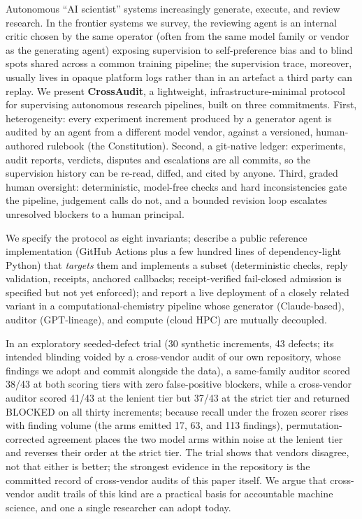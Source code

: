 \noindent Autonomous ``AI scientist'' systems increasingly generate, execute, and review research. In the frontier systems we survey, the reviewing agent is an internal critic chosen by the same operator (often from the same model family or vendor as the generating agent) exposing supervision to self-preference bias and to blind spots shared across a common training pipeline; the supervision trace, moreover, usually lives in opaque platform logs rather than in an artefact a third party can replay. We present \textbf{CrossAudit}, a lightweight, infrastructure-minimal protocol for supervising autonomous research pipelines, built on three commitments. First, heterogeneity: every experiment increment produced by a generator agent is audited by an agent from a different model vendor, against a versioned, human-authored rulebook (the Constitution). Second, a git-native ledger: experiments, audit reports, verdicts, disputes and escalations are all commits, so the supervision history can be re-read, diffed, and cited by anyone. Third, graded human oversight: deterministic, model-free checks and hard inconsistencies gate the pipeline, judgement calls do not, and a bounded revision loop escalates unresolved blockers to a human principal. \par
We specify the protocol as eight invariants; describe a public reference implementation (GitHub Actions plus a few hundred lines of dependency-light Python) that \emph{targets} them and implements a subset (deterministic checks, reply validation, receipts, anchored callbacks; receipt-verified fail-closed admission is specified but not yet enforced); and report a live deployment of a closely related variant in a computational-chemistry pipeline whose generator (Claude-based), auditor (GPT-lineage), and compute (cloud HPC) are mutually decoupled. \par
In an exploratory seeded-defect trial (30 synthetic increments, 43 defects; its intended blinding voided by a cross-vendor audit of our own repository, whose findings we adopt and commit alongside the data), a same-family auditor scored 38/43 at both scoring tiers with zero false-positive blockers, while a cross-vendor auditor scored 41/43 at the lenient tier but 37/43 at the strict tier and returned BLOCKED on all thirty increments; because recall under the frozen scorer rises with finding volume (the arms emitted 17, 63, and 113 findings), permutation-corrected agreement places the two model arms within noise at the lenient tier and reverses their order at the strict tier. The trial shows that vendors disagree, not that either is better; the strongest evidence in the repository is the committed record of cross-vendor audits of this paper itself. We argue that cross-vendor audit trails of this kind are a practical basis for accountable machine science, and one a single researcher can adopt today.
